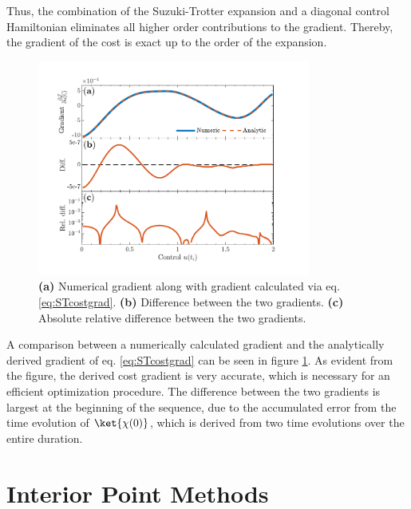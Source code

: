 Thus, the combination of the Suzuki-Trotter expansion and a diagonal control Hamiltonian eliminates all higher order contributions to the gradient. Thereby, the gradient of the cost is exact up to the order of the expansion.
\begin{figure}[!h]
    \centering
    \includegraphics[width=0.8\textwidth]{Figures/CompareGradientsGRAPE.pdf}
    \caption{\textbf{(a)} Numerical gradient along with gradient calculated via eq. \eqref{eq:STcostgrad}. \textbf{(b)} Difference between the two gradients. \textbf{(c)} Absolute relative difference between the two gradients.}
    \label{fig:CompareGradientsGRAPE}
\end{figure}
A comparison between a numerically calculated gradient and the analytically derived gradient of eq. \eqref{eq:STcostgrad} can be seen in figure \ref{fig:CompareGradientsGRAPE}. As evident from the figure, the derived cost gradient is very accurate, which is necessary for an efficient optimization procedure. The difference between the two gradients is largest at the beginning of the sequence, due to the accumulated error from the time evolution of $\ket{\chi (0)}$, which is derived from two time evolutions over the entire duration.


\section{Interior Point Methods} \label{sec:IntPoint}

